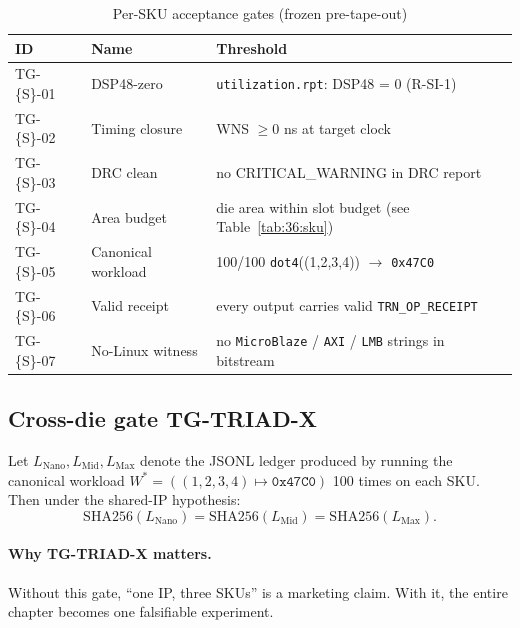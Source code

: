 \begin{table}[H]
\centering
\caption{Per-SKU acceptance gates (frozen pre-tape-out)}
\label{tab:36:tg-sku}
\small
\begin{tabular}{llp{7cm}}
\toprule
ID & Name & Threshold \\
\midrule
TG-\{S\}-01 & DSP48-zero          & \texttt{utilization.rpt}: DSP48 = 0 (R-SI-1) \\
TG-\{S\}-02 & Timing closure      & WNS $\geq 0$ ns at target clock \\
TG-\{S\}-03 & DRC clean           & no CRITICAL\_WARNING in DRC report \\
TG-\{S\}-04 & Area budget         & die area within slot budget (see Table~\ref{tab:36:sku}) \\
TG-\{S\}-05 & Canonical workload  & 100/100 \texttt{dot4}((1,2,3,4)) $\to$ \texttt{0x47C0} \\
TG-\{S\}-06 & Valid receipt       & every output carries valid \texttt{TRN\_OP\_RECEIPT} \\
TG-\{S\}-07 & No-Linux witness    & no \texttt{MicroBlaze} / \texttt{AXI} / \texttt{LMB} strings in bitstream \\
\bottomrule
\end{tabular}
\end{table}

\subsection{Cross-die gate TG-TRIAD-X}
\label{sec:36:tg-triad-x}

\begin{theorem}
\label{thm:36:triad-x}
Let $L_{\text{Nano}}, L_{\text{Mid}}, L_{\text{Max}}$ denote the JSONL ledger
produced by running the canonical workload $W^* = ((1,2,3,4) \mapsto \mathtt{0x47C0})$
100 times on each SKU. Then under the shared-IP hypothesis:
\[
\mathrm{SHA256}(L_{\text{Nano}}) =
\mathrm{SHA256}(L_{\text{Mid}}) =
\mathrm{SHA256}(L_{\text{Max}}).
\]
\end{theorem}

\paragraph{Why TG-TRIAD-X matters.}
Without this gate, \enquote{one IP, three SKUs} is a marketing claim. With
it, the entire chapter becomes one falsifiable experiment.

